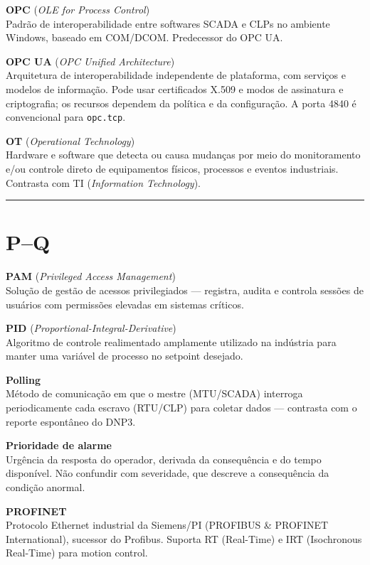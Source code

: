 \textbf{OPC} (\emph{OLE for Process Control})\\
Padrão de interoperabilidade entre softwares SCADA e CLPs no ambiente Windows, baseado em COM/DCOM. Predecessor do OPC UA.

\textbf{OPC UA} (\emph{OPC Unified Architecture})\\
Arquitetura de interoperabilidade independente de plataforma, com serviços e modelos de informação. Pode usar certificados X.509 e modos de assinatura e criptografia; os recursos dependem da política e da configuração. A porta 4840 é convencional para \passthrough{\lstinline!opc.tcp!}.

\textbf{OT} (\emph{Operational Technology})\\
Hardware e software que detecta ou causa mudanças por meio do monitoramento e/ou controle direto de equipamentos físicos, processos e eventos industriais. Contrasta com TI (\emph{Information Technology}).

\begin{center}\rule{0.5\linewidth}{0.5pt}\end{center}

\section{\texorpdfstring{P--Q}{PQ}}\label{pq}

\textbf{PAM} (\emph{Privileged Access Management})\\
Solução de gestão de acessos privilegiados --- registra, audita e controla sessões de usuários com permissões elevadas em sistemas críticos.

\textbf{PID} (\emph{Proportional-Integral-Derivative})\\
Algoritmo de controle realimentado amplamente utilizado na indústria para manter uma variável de processo no setpoint desejado.

\textbf{Polling}\\
Método de comunicação em que o mestre (MTU/SCADA) interroga periodicamente cada escravo (RTU/CLP) para coletar dados --- contrasta com o reporte espontâneo do DNP3.

\textbf{Prioridade de alarme}\\
Urgência da resposta do operador, derivada da consequência e do tempo disponível. Não confundir com severidade, que descreve a consequência da condição anormal.

\textbf{PROFINET}\\
Protocolo Ethernet industrial da Siemens/PI (PROFIBUS \& PROFINET International), sucessor do Profibus. Suporta RT (Real-Time) e IRT (Isochronous Real-Time) para motion control.

